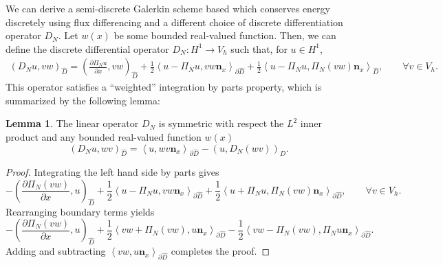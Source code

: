 \documentclass[preprint,10pt]{article}
\theoremstyle{definition}
\theoremstyle{lemma}
\newtheorem{lemma}{Lemma}
\theoremstyle{theorem}
\theoremstyle{assumption}
\newcommand{\pd}[2]{\frac{\partial#1}{\partial#2}}
\newcommand{\LRp}[1]{\left( #1 \right)}
\newcommand{\LRa}[1]{\left\langle #1 \right\rangle}
\begin{document}
We can derive a semi-discrete Galerkin scheme based which conserves energy discretely using flux differencing and a different choice of discrete differentiation operator $D_N$.  Let $w(x)$ be some bounded real-valued function.  Then, we can define the discrete differential operator $D_N: H^1\rightarrow V_h$ such that, for $u\in H^1$, 
\begin{align}
\LRp{D_N u, vw}_{\widehat{D}} = \LRp{\pd{ \Pi_N u}{x},vw}_{\widehat{D}} + \frac{1}{2}{\LRa{{u - \Pi_N u}, vw\bm{n}_x}}_{\partial \widehat{D}} + \frac{1}{2}\LRa{u - \Pi_Nu ,\Pi_N\LRp{vw}\bm{n}_x }_{\widehat{D}}, \qquad \forall v\in V_h.
\label{eq:dgd}
\end{align}
This operator satisfies a ``weighted'' integration by parts property, which is summarized by the following lemma:
\begin{lemma}
The linear operator $D_N$ is symmetric with respect the $L^2$ inner product and any bounded real-valued function $w(x)$ 
\[
\LRp{D_N u, wv}_{\widehat{D}} = \LRa{u,wv\bm{n}_x}_{\partial \widehat{D}} - \LRp{u,D_N (w v)}_{\widehat{D}}.
\]
\label{lemma:dgd_local}
\end{lemma}
\begin{proof}
Integrating the left hand side by parts gives
\[
-\LRp{\pd{ \Pi_N (vw)}{x},u}_{\widehat{D}} + \frac{1}{2}{\LRa{{u - \Pi_N u}, vw\bm{n}_x}}_{\partial \widehat{D}} + \frac{1}{2}\LRa{u + \Pi_Nu ,\Pi_N\LRp{vw}\bm{n}_x }_{\partial \widehat{D}}, \qquad \forall v\in V_h.
\]
Rearranging boundary terms yields
\[
-\LRp{\pd{ \Pi_N (vw)}{x},u}_{\widehat{D}} + \frac{1}{2}\LRa{vw + \Pi_N(vw) , u\bm{n}_x }_{\partial \widehat{D}}  - \frac{1}{2}\LRa{vw - \Pi_N (vw), \Pi_N u \bm{n}_x}_{\partial \widehat{D}}.  
\]
Adding and subtracting $\LRa{vw,u\bm{n}_x}_{\partial \widehat{D}}$ completes the proof.
\end{proof}
\end{document}
